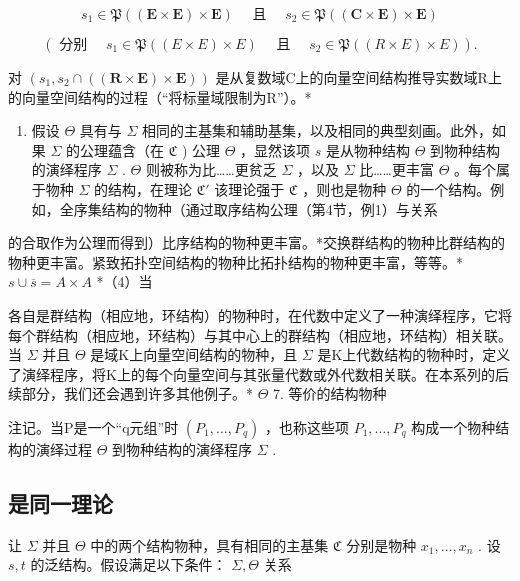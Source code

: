 \[
s _ {1} \in \mathfrak {P} ((\mathbf {E} \times \mathbf {E}) \times \mathbf {E}) \quad \text { 且 } \quad s _ {2} \in \mathfrak {P} ((\mathbf {C} \times \mathbf {E}) \times \mathbf {E})
\]

\[
(\text { 分别 } \quad s _ {1} \in \mathfrak {P} ((E \times E) \times E) \quad \text { 且 } \quad s _ {2} \in \mathfrak {P} ((R \times E) \times E)).
\]

对 \((s_{1}, s_{2} \cap ((\mathbf{R} \times \mathbf{E}) \times \mathbf{E}))\) 是从复数域C上的向量空间结构推导实数域R上的向量空间结构的过程（“将标量域限制为R”）。*

\begin{enumerate}
\def\labelenumi{(\arabic{enumi})}
\setcounter{enumi}{2}
\tightlist
\item
  假设 \(\Theta\) 具有与 \(\Sigma\) 相同的主基集和辅助基集，以及相同的典型刻画。此外，如果 \(\Sigma\) 的公理蕴含（在 \(\mathfrak{C}\) ) 公理 \(\Theta\) ，显然该项 \(s\) 是从物种结构 \(\Theta\) 到物种结构的演绎程序 \(\Sigma\) . \(\Theta\) 则被称为比……更贫乏 \(\Sigma\) ，以及 \(\Sigma\) 比……更丰富 \(\Theta\) 。每个属于物种 \(\Sigma\) 的结构，在理论 \(\mathfrak{C}'\) 该理论强于 \(\mathfrak{C}\) ，则也是物种 \(\Theta\) 的一个结构。例如，全序集结构的物种（通过取序结构公理（第4节，例1）与关系
\end{enumerate}

的合取作为公理而得到）比序结构的物种更丰富。*交换群结构的物种比群结构的物种更丰富。紧致拓扑空间结构的物种比拓扑结构的物种更丰富，等等。* \(s \cup \overline{s} = A \times A\) *（4）当

各自是群结构（相应地，环结构）的物种时，在代数中定义了一种演绎程序，它将每个群结构（相应地，环结构）与其中心上的群结构（相应地，环结构）相关联。当 \(\Sigma\) 并且 \(\Theta\) 是域K上向量空间结构的物种，且 \(\Sigma\) 是K上代数结构的物种时，定义了演绎程序，将K上的每个向量空间与其张量代数或外代数相关联。在本系列的后续部分，我们还会遇到许多其他例子。* \(\Theta\) 7. 等价的结构物种

注记。当P是一个“q元组”时 \((P_{1}, \ldots, P_{q})\) ，也称这些项 \(P_{1}, \ldots, P_{q}\) 构成一个物种结构的演绎过程 \(\Theta\) 到物种结构的演绎程序 \(\Sigma\) .

\subsection{是同一理论}

让 \(\Sigma\) 并且 \(\Theta\) 中的两个结构物种，具有相同的主基集 \(\mathfrak{C}\) 分别是物种 \(x_{1},\ldots ,x_{n}\) . 设 \(s,t\) 的泛结构。假设满足以下条件： \(\Sigma,\Theta\) 关系

